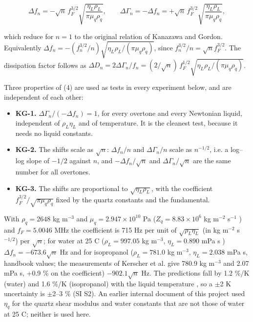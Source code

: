 \documentclass[11pt,a4paper]{article}
\begin{document}
\begin{equation}\tag{4}
\Delta f_n = -\sqrt n\,f_F^{3/2}\sqrt{\frac{\eta_L\rho_L}{\pi\mu_q\rho_q}},\qquad \Delta\Gamma_n = -\Delta f_n = +\sqrt n\,f_F^{3/2}\sqrt{\frac{\eta_L\rho_L}{\pi\mu_q\rho_q}},
\end{equation}

which reduce for $n = 1$ to the original relation of Kanazawa and Gordon. Equivalently $\Delta f_n = -(f_n^{3/2}/n)\sqrt{\eta_L\rho_L/(\pi\mu_q\rho_q)}$, since $f_n^{3/2}/n = \sqrt n f_F^{3/2}$. The dissipation factor follows as $\Delta D_n = 2\Delta\Gamma_n/f_n = (2/\sqrt n)\,f_F^{1/2}\sqrt{\eta_L\rho_L/(\pi\mu_q\rho_q)}$.

Three properties of (4) are used as tests in every experiment below, and are independent of each other:

\begin{itemize}
\item \textbf{KG-1.} $\Delta\Gamma_n/(-\Delta f_n) = 1$, for every overtone and every Newtonian liquid, independent of $\rho_L\eta_L$ and of temperature. It is the cleanest test, because it needs no liquid constants.
\item \textbf{KG-2.} The shifts scale as $\sqrt n$: $\Delta f_n/n$ and $\Delta\Gamma_n/n$ scale as $n^{-1/2}$, i.e. a log--log slope of $-1/2$ against $n$, and $-\Delta f_n/\sqrt n$ and $\Delta\Gamma_n/\sqrt n$ are the same number for all overtones.
\item \textbf{KG-3.} The shifts are proportional to $\sqrt{\eta_L\rho_L}$, with the coefficient $f_F^{3/2}/\sqrt{\pi\mu_q\rho_q}$ fixed by the quartz constants and the fundamental.
\end{itemize}

With $\rho_q = 2648$ kg m$^{-3}$ and $\mu_q = 2.947\times10^{10}$ Pa ($Z_q = 8.83\times10^6$ kg m$^{-2}$ s$^{-1}$ \citep{Johannsmann2021}) and $f_F = 5.0046$ MHz the coefficient is 715 Hz per unit of $\sqrt{\rho_L\eta_L}$ (in kg m$^{-2}$ s$^{-1/2}$) per $\sqrt n$; for water at 25 \textdegree{}C ($\rho_L = 997.05$ kg m$^{-3}$, $\eta_L = 0.890$ mPa s \citep{NISTWebBookWater}) $\Delta f_n = -673.6\sqrt n$ Hz and for isopropanol ($\rho_L = 781.0$ kg m$^{-3}$, $\eta_L = 2.038$ mPa s, handbook values; the measurements of Kerscher et al. \citep{Kerscher2024} give 780.9 kg m$^{-3}$ and 2.07 mPa s, +0.9 \% on the coefficient) $-902.1\sqrt n$ Hz. The predictions fall by 1.2 \%/K (water) and 1.6 \%/K (isopropanol) with the liquid temperature \citep{NISTWebBookWater, Kerscher2024}, so a $\pm$2 K uncertainty is $\pm$2--3 \% (SI S2). An earlier internal document of this project used $\eta_q$ for the quartz shear modulus and water constants that are not those of water at 25 \textdegree{}C; neither is used here.
\end{document}
